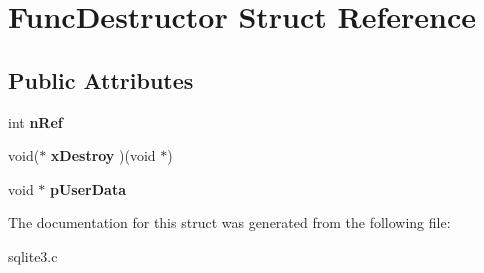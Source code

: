 \hypertarget{struct_func_destructor}{\section{Func\-Destructor Struct Reference}
\label{struct_func_destructor}
}
\subsection*{Public Attributes}
\begin{DoxyCompactItemize}
\item 
\hypertarget{struct_func_destructor_a8b1bf3af00c88400efc1dd74a4410463}{int {\bfseries n\-Ref}}\label{struct_func_destructor_a8b1bf3af00c88400efc1dd74a4410463}

\item 
\hypertarget{struct_func_destructor_a8d688d51ad881306c81b3f8d4795e076}{void($\ast$ {\bfseries x\-Destroy} )(void $\ast$)}\label{struct_func_destructor_a8d688d51ad881306c81b3f8d4795e076}

\item 
\hypertarget{struct_func_destructor_a181875609f0f8221985cd6cfd7ad8cd8}{void $\ast$ {\bfseries p\-User\-Data}}\label{struct_func_destructor_a181875609f0f8221985cd6cfd7ad8cd8}

\end{DoxyCompactItemize}


The documentation for this struct was generated from the following file\-:\begin{DoxyCompactItemize}
\item 
sqlite3.\-c\end{DoxyCompactItemize}
